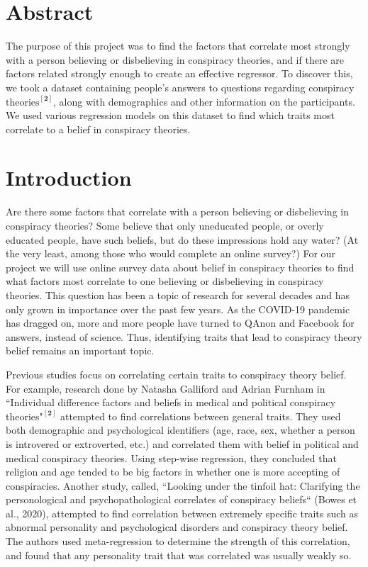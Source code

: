 \documentclass{article}[11pt]
\begin{document}
    
    \maketitle
    
        
    \hypertarget{abstract}{%
\section*{Abstract}\label{abstract}}

The purpose of this project was to find the factors that correlate most strongly with
a person believing or disbelieving in conspiracy theories, and if there
are factors related strongly enough to create an effective
regressor. To discover this, we took a dataset containing people's answers to 
questions regarding conspiracy $\text{theories}^{[\textbf{2}]}$, along with demographics and other information
on the participants. We used various regression models on this dataset to find
which traits most correlate to a belief in conspiracy theories.
\section*{Introduction} Are there some factors that correlate with a person
believing or disbelieving in conspiracy theories? Some believe that only
uneducated people, or overly educated people, have such beliefs, but do
these impressions hold any water? (At the very least, among those who
would complete an online survey?) For our project we will use online
survey data about belief in conspiracy theories to find what factors
most correlate to one believing or disbelieving in conspiracy theories.
This question has been a topic of research for several decades and has
only grown in importance over the past few years. As the COVID-19
pandemic has dragged on, more and more people have turned to QAnon and
Facebook for answers, instead of science. Thus, identifying traits that
lead to conspiracy theory belief remains an important topic. 

Previous studies focus on correlating certain traits to conspiracy theory belief.
For example, research done by Natasha Galliford and Adrian Furnham in
``Individual difference factors and beliefs in medical and political
conspiracy theories$\text{"}^{[\mathbf{2}]}$ attempted to find correlations between general
traits. They used both demographic and psychological identifiers (age,
race, sex, whether a person is introvered or extroverted, etc.) and
correlated them with belief in political and medical conspiracy
theories. Using step-wise regression, they concluded that religion and
age tended to be big factors in whether one is more accepting of
conspiracies. Another study, called, ``Looking under the tinfoil hat:
Clarifying the personological and psychopathological correlates of
conspiracy beliefs`` (Bowes et al., 2020), attempted to find correlation
between extremely specific traits such as abnormal personality and
psychological disorders and conspiracy theory belief. The authors used
meta-regression to determine the strength of this correlation, and found
that any personality trait that was correlated was usually weakly so.
\end{document}
